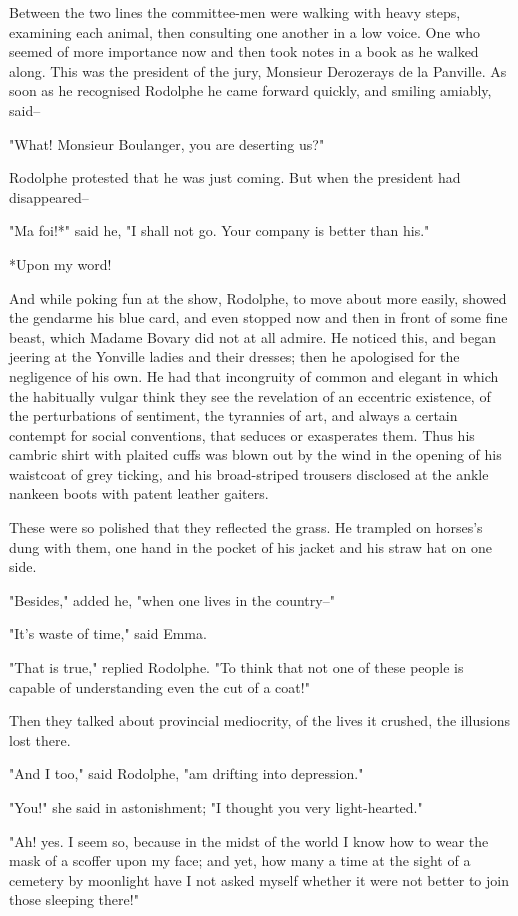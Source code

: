 \documentclass[11pt,twocolumn]{ltugboat}
\begin{document}
Between the two lines the committee-men were walking with heavy steps,
examining each animal, then consulting one another in a low voice. One
who seemed of more importance now and then took notes in a book as he
walked along. This was the president of the jury, Monsieur Derozerays de
la Panville. As soon as he recognised Rodolphe he came forward quickly,
and smiling amiably, said--

"What! Monsieur Boulanger, you are deserting us?"

Rodolphe protested that he was just coming. But when the president had
disappeared--

"Ma foi!*" said he, "I shall not go. Your company is better than his."

     *Upon my word!

And while poking fun at the show, Rodolphe, to move about more easily,
showed the gendarme his blue card, and even stopped now and then in
front of some fine beast, which Madame Bovary did not at all admire.
He noticed this, and began jeering at the Yonville ladies and their
dresses; then he apologised for the negligence of his own. He had that
incongruity of common and elegant in which the habitually vulgar think
they see the revelation of an eccentric existence, of the perturbations
of sentiment, the tyrannies of art, and always a certain contempt for
social conventions, that seduces or exasperates them. Thus his cambric
shirt with plaited cuffs was blown out by the wind in the opening of his
waistcoat of grey ticking, and his broad-striped trousers disclosed at
the ankle nankeen boots with patent leather gaiters.

These were so polished that they reflected the grass. He trampled on
horses's dung with them, one hand in the pocket of his jacket and his
straw hat on one side.

"Besides," added he, "when one lives in the country--"

"It's waste of time," said Emma.

"That is true," replied Rodolphe. "To think that not one of these people
is capable of understanding even the cut of a coat!"

Then they talked about provincial mediocrity, of the lives it crushed,
the illusions lost there.

"And I too," said Rodolphe, "am drifting into depression."

"You!" she said in astonishment; "I thought you very light-hearted."

"Ah! yes. I seem so, because in the midst of the world I know how to
wear the mask of a scoffer upon my face; and yet, how many a time at the
sight of a cemetery by moonlight have I not asked myself whether it were
not better to join those sleeping there!"
\end{document}
